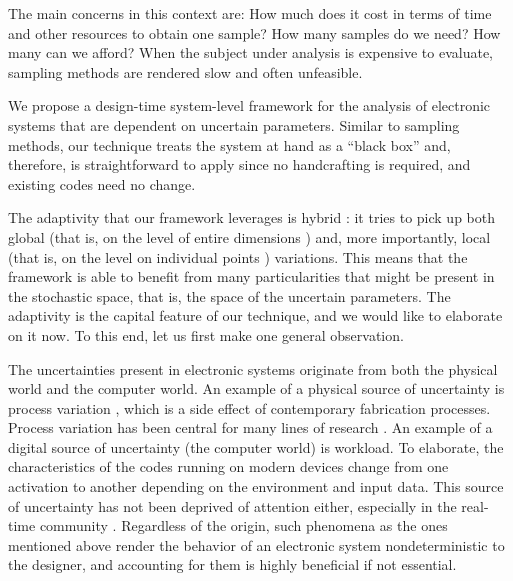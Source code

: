  The main concerns in this context are: How much does
it cost in terms of time and other resources to obtain one sample? How many
samples do we need? How many can we afford? When the subject under analysis is
expensive to evaluate, sampling methods are rendered slow and often unfeasible.

We propose a design-time system-level framework for the analysis of electronic
systems that are dependent on uncertain parameters. Similar to sampling methods,
our technique treats the system at hand as a ``black box'' and, therefore, is
straightforward to apply since no handcrafting is required, and existing codes
need no change. 

 The adaptivity that our framework leverages is hybrid
\cite{jakeman2012}: it tries to pick up both global (that is, on the level of
entire dimensions \cite{klimke2006}) and, more importantly, local (that is, on
the level on individual points \cite{ma2009}) variations. This means that the
framework is able to benefit from many particularities that might be present in
the stochastic space, that is, the space of the uncertain parameters. The
adaptivity is the capital feature of our technique, and we would like to
elaborate on it now. To this end, let us first make one general observation.

The uncertainties present in electronic systems originate from both the physical
world and the computer world. An example of a physical source of uncertainty is
process variation \cite{srivastava2005}, which is a side effect of contemporary
fabrication processes. Process variation has been central for many lines of
research \cite{bhardwaj2008, juan2012, lee2013, ukhov2014, ukhov2015}. An
example of a digital source of uncertainty (the computer world) is workload. To
elaborate, the characteristics of the codes running on modern devices change
from one activation to another depending on the environment and input data. This
source of uncertainty has not been deprived of attention either, especially in
the real-time community \cite{quinton2012, diaz2002, santinelli2011,
tanasa2015}. Regardless of the origin, such phenomena as the ones mentioned
above render the behavior of an electronic system nondeterministic to the
designer, and accounting for them is highly beneficial if not essential.

